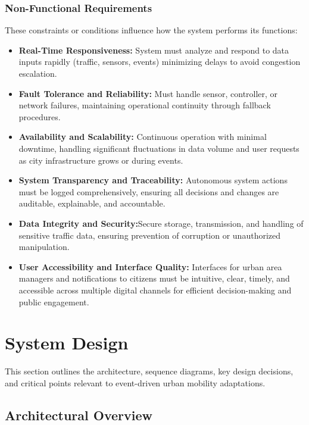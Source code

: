 \documentclass[a4paper,12pt]{article}
\begin{document}
\subsubsection{Non-Functional Requirements}
These constraints or conditions influence how the system performs its functions:
\begin{itemize}
\item \textbf{Real-Time Responsiveness:}  System must analyze and respond to data inputs rapidly (traffic, sensors, events) minimizing delays to avoid congestion escalation. \\
\item \textbf{Fault Tolerance and Reliability:}  Must handle sensor, controller, or network failures, maintaining operational continuity through fallback procedures. \\
\item \textbf{Availability and Scalability:}  Continuous operation with minimal downtime, handling significant fluctuations in data volume and user requests as city infrastructure grows or during events. \\
\item \textbf{System Transparency and Traceability:}  Autonomous system actions must be logged comprehensively, ensuring all decisions and changes are auditable, explainable, and accountable. \\
\item \textbf{Data Integrity and Security:}Secure storage, transmission, and handling of sensitive traffic data, ensuring prevention of corruption or unauthorized manipulation. \\
\item \textbf{User Accessibility and Interface Quality:}  Interfaces for urban area managers and notifications to citizens must be intuitive, clear, timely, and accessible across multiple digital channels for efficient decision-making and public engagement. \\   
\end{itemize}

\newpage

\section{System Design}
This section outlines the architecture, sequence diagrams, key design decisions, and critical points relevant to event-driven urban mobility adaptations.

\subsection{Architectural Overview}
\end{document}

